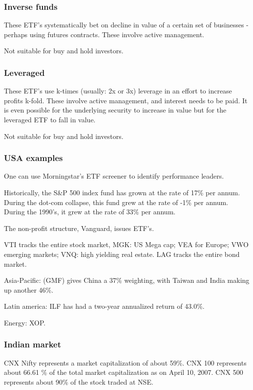 \documentclass[oneside, article]{memoir}
\begin{document}
\subsubsection{Inverse funds}
These ETF's systematically bet on decline in value of a certain set of businesses - perhaps using futures contracts. These involve active management.

Not suitable for buy and hold investors.

\subsubsection{Leveraged}
These ETF's use k-times (usually: 2x or 3x) leverage in an effort to increase profits k-fold. These involve active management, and interest needs to be paid. It is even possible for the underlying security to increase in value but for the leveraged ETF to fall in value.

Not suitable for buy and hold investors.

\subsubsection{USA examples}
One can use Morningstar's ETF screener to identify performance leaders.

Historically, the S\&P 500 index fund has grown at the rate of 17\% per annum. During the dot-com collapse, this fund grew at the rate of -1\% per annum. During the 1990's, it grew at the rate of 33\% per annum. 

The non-profit structure, Vanguard, issues ETF's.

VTI tracks the entire stock market, MGK: US Mega cap; VEA for Europe; VWO emerging markets; VNQ: high yielding real estate. LAG tracks the entire bond market.

Asia-Pacific: (GMF) gives China a 37\% weighting, with Taiwan and India making up another 46\%.

Latin america: ILF has had a two-year annualized return of 43.0\%.

Energy: XOP.

\subsubsection{Indian market}
CNX Nifty represents a market capitalization of about 59\%. CNX 100 represents about 66.61 \% of the total market capitalization as on April 10, 2007. CNX 500 represents about 90\% of the stock traded at NSE.
\end{document}
